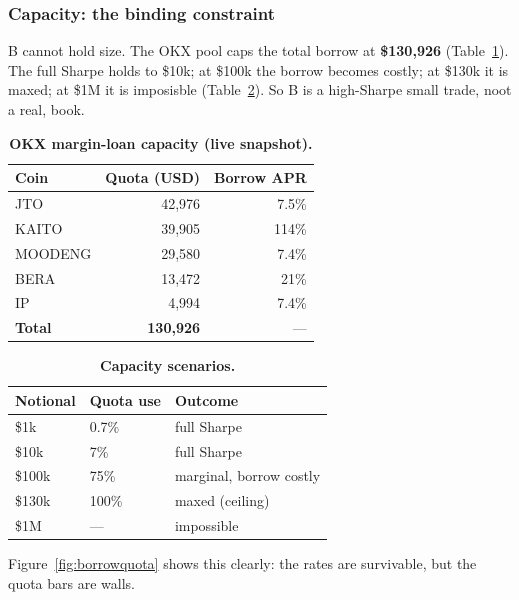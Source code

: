 \documentclass[10pt,twocolumn,a4paper]{article}
\begin{document}
\subsubsection{Capacity: the binding constraint}

B cannot hold size.  The OKX pool caps the total borrow at \textbf{\$130{,}926}
(Table~\ref{tab:capacity}).  The full Sharpe holds to \$10k; at \$100k the borrow
becomes costly; at \$130k it is maxed; at \$1M it is imposisble
(Table~\ref{tab:capscenarios}).  So B is a high-Sharpe small trade, noot a real, book.

\begin{table}[H]
  \centering
  \caption{\textbf{OKX margin-loan capacity (live snapshot).}}
  \label{tab:capacity}
  \begin{tabular}{lrr}
    \toprule
    \textbf{Coin} & \textbf{Quota (USD)} & \textbf{Borrow APR} \\
    \midrule
    JTO     & 42{,}976 & 7.5\% \\
    KAITO   & 39{,}905 & 114\% \\
    MOODENG & 29{,}580 & 7.4\% \\
    BERA    & 13{,}472 & 21\% \\
    IP      &  4{,}994 & 7.4\% \\
    \midrule
    \textbf{Total} & \textbf{130{,}926} & --- \\
    \bottomrule
  \end{tabular}
\end{table}

\begin{table}[H]
  \centering
  \caption{\textbf{Capacity scenarios.}}
  \label{tab:capscenarios}
  \begin{tabular}{lll}
    \toprule
    \textbf{Notional} & \textbf{Quota use} & \textbf{Outcome} \\
    \midrule
    \$1k    & 0.7\%  & full Sharpe \\
    \$10k   & 7\%    & full Sharpe \\
    \$100k  & 75\%   & marginal, borrow costly \\
    \$130k  & 100\%  & maxed (ceiling) \\
    \$1M    & ---    & impossible \\
    \bottomrule
  \end{tabular}
\end{table}

Figure~\ref{fig:borrowquota} shows this clearly: the rates are survivable, but the
quota bars are walls.
\end{document}
